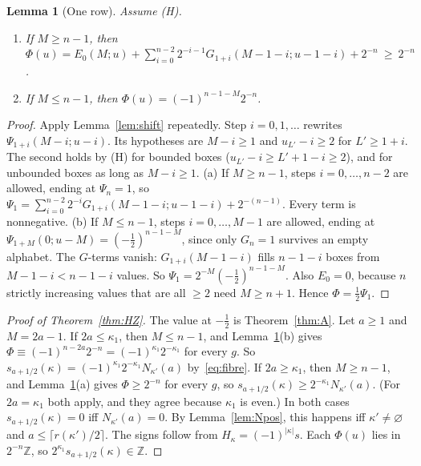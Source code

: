 \documentclass[11pt]{amsart}
\newtheorem{lemma}[theorem]{Lemma}
\theoremstyle{definition}
\theoremstyle{remark}
\newcommand{\Z}{\mathbb{Z}}
\begin{document}
\begin{lemma}[One row]\label{lem:onerow}
Assume (H).
\begin{enumerate}[label=(\alph*)]
\item If $M\ge n-1$, then
$\Phi(u)=E_0(M;u)+\sum_{i=0}^{n-2}2^{-i-1}G_{1+i}(M-1-i;u-1-i)+2^{-n}\ \ge\ 2^{-n}$.
\item If $M\le n-1$, then $\Phi(u)=(-1)^{n-1-M}2^{-n}$.
\end{enumerate}
\end{lemma}

\begin{proof}
Apply Lemma~\ref{lem:shift} repeatedly. Step $i=0,1,\dots$ rewrites $\Psi_{1+i}(M-i;u-i)$. Its
hypotheses are $M-i\ge1$ and $u_{L'}-i\ge2$ for $L'\ge1+i$. The second holds by (H) for bounded
boxes ($u_{L'}-i\ge L'+1-i\ge2$), and for unbounded boxes as long as $M-i\ge1$.
(a) If $M\ge n-1$, steps $i=0,\dots,n-2$ are allowed, ending at $\Psi_n=1$, so
$\Psi_1=\sum_{i=0}^{n-2}2^{-i}G_{1+i}(M-1-i;u-1-i)+2^{-(n-1)}$. Every term is nonnegative.
(b) If $M\le n-1$, steps $i=0,\dots,M-1$ are allowed, ending at
$\Psi_{1+M}(0;u-M)=(-\tfrac12)^{n-1-M}$, since only $G_n=1$ survives an empty alphabet. The
$G$-terms vanish: $G_{1+i}(M-1-i)$ fills $n-1-i$ boxes from $M-1-i<n-1-i$ values. So
$\Psi_1=2^{-M}(-\tfrac12)^{n-1-M}$. Also $E_0=0$, because $n$ strictly increasing values that are
all $\ge2$ need $M\ge n+1$. Hence $\Phi=\tfrac12\Psi_1$.
\end{proof}

\begin{proof}[Proof of Theorem~\ref{thm:HZ}]
The value at $-\tfrac12$ is Theorem~\ref{thm:A}. Let $a\ge1$ and $M=2a-1$. If $2a\le\kappa_1$,
then $M\le n-1$, and Lemma~\ref{lem:onerow}(b) gives
$\Phi\equiv(-1)^{n-2a}2^{-n}=(-1)^{\kappa_1}2^{-\kappa_1}$ for every $g$. So
$s_{a+1/2}(\kappa)=(-1)^{\kappa_1}2^{-\kappa_1}N_{\kappa'}(a)$ by~\eqref{eq:fibre}. If
$2a\ge\kappa_1$, then $M\ge n-1$, and Lemma~\ref{lem:onerow}(a) gives $\Phi\ge2^{-n}$ for every
$g$, so $s_{a+1/2}(\kappa)\ge2^{-\kappa_1}N_{\kappa'}(a)$. (For $2a=\kappa_1$ both apply, and
they agree because $\kappa_1$ is even.) In both cases $s_{a+1/2}(\kappa)=0$ iff
$N_{\kappa'}(a)=0$. By Lemma~\ref{lem:Npos}, this happens iff $\kappa'\ne\varnothing$ and
$a\le\lceil r(\kappa')/2\rceil$. The signs follow from $H_\kappa=(-1)^{|\kappa|}s$. Each
$\Phi(u)$ lies in $2^{-n}\Z$, so $2^{\kappa_1}s_{a+1/2}(\kappa)\in\Z$.
\end{proof}
\end{document}
